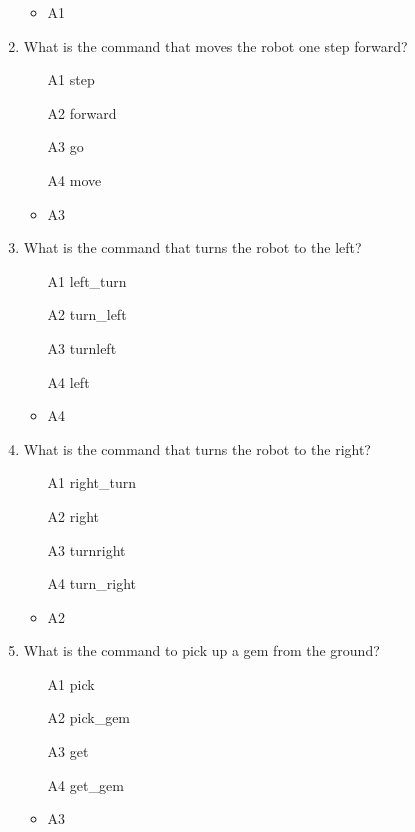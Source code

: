 \documentclass[article,A4,12pt]{llncs}
\begin{document}
\begin{enumerate}
\begin{enumerate}
\end{enumerate}
  \begin{itemize}
    \item A1
  \end{itemize}
\item What is the command that moves the robot one step forward?
\begin{enumerate}
\item[A1] step
\item[A2] forward
\item[A3] go
\item[A4] move
\end{enumerate}
  \begin{itemize}
    \item A3
  \end{itemize}
\item What is the command that turns the robot to the left?
\begin{enumerate}
\item[A1] left\_turn
\item[A2] turn\_left
\item[A3] turnleft
\item[A4] left
\end{enumerate}
  \begin{itemize}
    \item A4
  \end{itemize}
\item What is the command that turns the robot to the right?
\begin{enumerate}
\item[A1] right\_turn
\item[A2] right
\item[A3] turnright
\item[A4] turn\_right
\end{enumerate}
  \begin{itemize}
    \item A2
  \end{itemize}
\item What is the command to pick up a gem from the ground?
\begin{enumerate}
\item[A1] pick
\item[A2] pick\_gem
\item[A3] get
\item[A4] get\_gem
\end{enumerate}
  \begin{itemize}
    \item A3

\end{itemize}
\end{enumerate}
\end{document}
